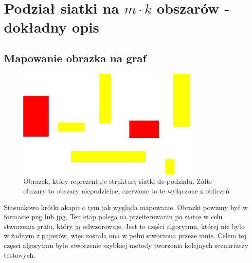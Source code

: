 \newpage
\section{Podział siatki na $m \cdot k$ obszarów - dokładny opis}

\subsection{Mapowanie obrazka na graf}
\begin{figure}
    \vspace{-4mm}
    \includegraphics[width=\linewidth]{images/grid1}
    \caption{Obrazek, który reprezentuje strukturę siatki do podziału. Żółte obszary to obszary niepodzielne, czerwone to
    te wyłączone z obliczeń}
    \label{im:input}
\end{figure}
Stosunkowo krótki akapit o tym jak wygląda mapowanie.
Obrazki powinny być w formacie png lub jpg. Ten etap polega na przeiterowaniu po siatce w celu stworzenia grafu, który
ją odwzorowuje. Jest to części algorytmu, której nie było w żadnym z paperów, więc została ona w pełni stworzona przeze mnie.
Celem tej częsci algorytmu było stworzenie szybkiej metody tworzenia kolejnych scenariuszy testowych.